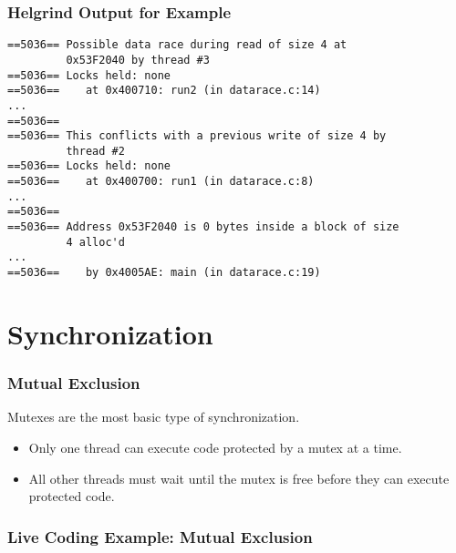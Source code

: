 \documentclass[aspectratio=43]{beamer}
\newenvironment{changemargin}[1]{%
  \begin{list}{}{%
    \setlength{\topsep}{0pt}%
    \setlength{\leftmargin}{#1}%
    \setlength{\rightmargin}{1em}
    \setlength{\listparindent}{\parindent}%
    \setlength{\itemindent}{\parindent}%
    \setlength{\parsep}{\parskip}%
  }%
  \item[]}{\end{list}}
\begin{document}
\begin{frame}[fragile]
  \frametitle{Helgrind Output for Example}

  \begin{changemargin}{.8cm}
  \begin{lstlisting}
==5036== Possible data race during read of size 4 at
         0x53F2040 by thread #3
==5036== Locks held: none
==5036==    at 0x400710: run2 (in datarace.c:14)
...
==5036== 
==5036== This conflicts with a previous write of size 4 by
         thread #2
==5036== Locks held: none
==5036==    at 0x400700: run1 (in datarace.c:8)
...
==5036== 
==5036== Address 0x53F2040 is 0 bytes inside a block of size
         4 alloc'd
...
==5036==    by 0x4005AE: main (in datarace.c:19)
  \end{lstlisting}
  \end{changemargin}
\end{frame}


\section{Synchronization}
\begin{frame}
  \frametitle{Mutual Exclusion}

\begin{changemargin}{1.5cm}
    Mutexes are the most basic type of synchronization.
    \vfill
    \begin{itemize}
    \item Only one thread can execute code protected by a mutex at a time.
    \vfill
    \item All other threads must wait until the mutex is free before they can
      execute protected code.
    \end{itemize}
\end{changemargin}

\end{frame}

\begin{frame}
  \frametitle{Live Coding Example: Mutual Exclusion}
\end{frame}
\end{document}

